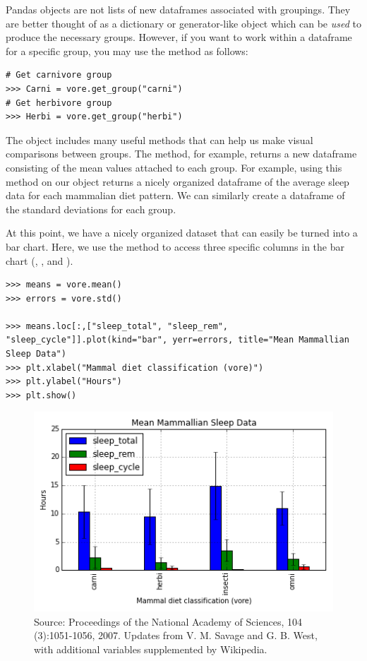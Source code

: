 Pandas  objects are not lists of new dataframes associated with groupings.
They are better thought of as a dictionary or generator-like object which can be \emph{used} to produce the necessary groups.
However, if you want to work within a dataframe for a specific group, you may use the  method as follows:

\begin{lstlisting}
# Get carnivore group
>>> Carni = vore.get_group("carni")
# Get herbivore group
>>> Herbi = vore.get_group("herbi")
\end{lstlisting}

The  object includes many useful methods that can help us make visual comparisons between groups. 
The  method, for example, returns a new dataframe consisting of the mean values attached to each group.
For example, using this method on our  object returns a nicely organized dataframe of the average sleep data for each mammalian diet pattern.
We can similarly create a dataframe of the standard deviations for each group.

At this point, we have a nicely organized dataset that can easily be turned into a bar chart.
Here, we use the  method to access three specific columns in the bar chart (, , and ).
\begin{lstlisting}
>>> means = vore.mean()
>>> errors = vore.std()

>>> means.loc[:,["sleep_total", "sleep_rem", "sleep_cycle"]].plot(kind="bar", yerr=errors, title="Mean Mammallian Sleep Data")
>>> plt.xlabel("Mammal diet classification (vore)")
>>> plt.ylabel("Hours")
>>> plt.show()
\end{lstlisting}

\begin{figure}[H] 
    \centering
    \includegraphics[width=.75\textwidth]{MeanMammal.png}
    \caption{Source:  Proceedings of the National Academy of Sciences, 104 (3):1051-1056, 2007. Updates from V. M. Savage and G. B. West, with additional variables supplemented by Wikipedia.}
    \label{fig:aplot}
\end{figure}

